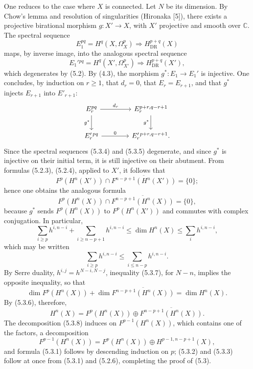 \documentclass[10pt]{article}
\providecommand{\C}{\mathbb C}
\providecommand{\DR}{\operatorname{DR}}
\begin{document}
One reduces to the case where $X$ is connected. Let $N$ be its dimension. By Chow's lemma and resolution of singularities (Hironaka [5]), there exists a projective birational morphism $g:X'\to X$, with $X'$ projective and smooth over $\C$. The spectral sequence
\[
\tag{5.3.4}
E_1^{pq}=H^q(X,\Omega_X^p)\Longrightarrow H_{\DR}^{p+q}(X)
\]
maps, by inverse image, into the analogous spectral sequence
\[
\tag{5.3.5}
E_1'{}^{pq}=H^q(X',\Omega_{X'}^p)\Longrightarrow H_{\DR}^{p+q}(X'),
\]
which degenerates by (5.2). By (4.3), the morphism $g^*:E_1\to E_1'$ is injective. One concludes, by induction on $r\ge1$, that $d_r=0$, that $E_r=E_{r+1}$, and that $g^*$ injects $E_{r+1}$ into $E'_{r+1}$:
\[
\begin{tikzcd}[column sep=4.0em,row sep=2.1em]
E_r^{pq} \arrow[r,"d_r"] \arrow[d,"g^*"'] & E_r^{p+r,q-r+1} \arrow[d,"g^*"']\\
E_r'{}^{pq} \arrow[r,"0"] & E_r'{}^{p+r,q-r+1} .
\end{tikzcd}
\]
Since the spectral sequences (5.3.4) and (5.3.5) degenerate, and since $g^*$ is injective on their initial term, it is still injective on their abutment. From formulas (5.2.3), (5.2.4), applied to $X'$, it follows that
\[
F^p(H^n(X'))\cap\overline{F^{n-p+1}(H^n(X'))}=\{0\};
\]
hence one obtains the analogous formula
\[
\tag{5.3.6}
F^p(H^n(X))\cap\overline{F^{n-p+1}(H^n(X))}=\{0\},
\]
because $g^*$ sends $F^p(H^n(X))$ to $F^p(H^n(X'))$ and commutes with complex conjugation. In particular,
\[
\sum_{i\ge p}h^{i,n-i}+\sum_{i\ge n-p+1}h^{i,n-i}\le\dim H^n(X)\le\sum_i h^{i,n-i},
\]
which may be written
\[
\tag{5.3.7}
\sum_{i\ge p}h^{i,n-i}\le\sum_{i\le n-p}h^{i,n-i}.
\]
By Serre duality, $h^{i,j}=h^{N-i,N-j}$, inequality (5.3.7), for $N-n$, implies the opposite inequality, so that
\[
\dim F^p(H^n(X))+\dim \overline{F^{n-p+1}(H^n(X))}=\dim H^n(X).
\]
By (5.3.6), therefore,
\[
\tag{5.3.8}
H^n(X)=F^p(H^n(X))\oplus\overline{F^{n-p+1}(H^n(X))}.
\]
The decomposition (5.3.8) induces on $F^{p-1}(H^n(X))$, which contains one of the factors, a decomposition
\[
F^{p-1}(H^n(X))=F^p(H^n(X))\oplus H^{p-1,n-p+1}(X),
\]
and formula (5.3.1) follows by descending induction on $p$; (5.3.2) and (5.3.3) follow at once from (5.3.1) and (5.2.6), completing the proof of (5.3).
\end{document}
